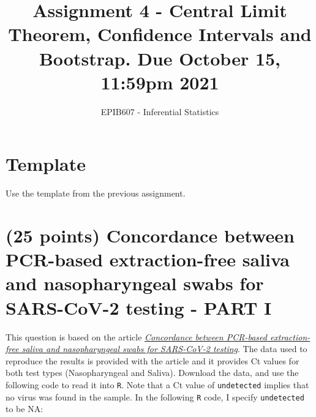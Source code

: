 \documentclass[letterpaper,12pt,twoside,]{pinp}
\title{Assignment 4 - Central Limit Theorem, Confidence Intervals and
Bootstrap. Due October 15, 11:59pm 2021}
\author[a]{EPIB607 - Inferential Statistics}
\affil[a]{Fall 2021, McGill University}
\begin{document}
\verticaladjustment{-2pt}

\maketitle
\thispagestyle{firststyle}



\hypertarget{template}{%
\section*{Template}\label{template}}

Use the template from the previous assignment.

\hypertarget{points-concordance-between-pcr-based-extraction-free-saliva-and-nasopharyngeal-swabs-for-sars-cov-2-testing---part-i}{%
\section{(25 points) Concordance between PCR-based extraction-free
saliva and nasopharyngeal swabs for SARS-CoV-2 testing - PART
I}\label{points-concordance-between-pcr-based-extraction-free-saliva-and-nasopharyngeal-swabs-for-sars-cov-2-testing---part-i}}

This question is based on the article
\href{https://hrbopenresearch.org/articles/4-85/v1}{\emph{Concordance
between PCR-based extraction-free saliva and nasopharyngeal swabs for
SARS-CoV-2 testing}}. The data used to reproduce the results is provided
with the article and it provides Ct values for both test types
(Nasopharyngeal and Saliva). Download the data, and use the following
code to read it into \texttt{R}. Note that a Ct value of
\texttt{undetected} implies that no virus was found in the sample. In
the following \texttt{R} code, I specify \texttt{undetected} to be NA:

\newpage
\end{document}
